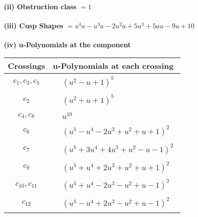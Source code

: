 \documentclass[1p]{elsarticle_modified}
\theoremstyle{definition}
\begin{document}
\flushleft \textbf{(ii) Obstruction class $= 1$}\\~\\
\flushleft \textbf{(iii) Cusp Shapes $= u^4 a- u^3 a-2 u^2 a+5 u^3+5 a u-9 u+10$}\\~\\
\newpage\renewcommand{\arraystretch}{1}
\flushleft \textbf{(iv) u-Polynomials at the component}\newline \\
\begin{tabular}{m{50pt}|m{274pt}}
Crossings & \hspace{64pt}u-Polynomials at each crossing \\
\hline $$\begin{aligned}c_{1},c_{3},c_{5}\end{aligned}$$&$\begin{aligned}
&(u^2- u+1)^5
\end{aligned}$\\
\hline $$\begin{aligned}c_{2}\end{aligned}$$&$\begin{aligned}
&(u^2+u+1)^5
\end{aligned}$\\
\hline $$\begin{aligned}c_{4},c_{8}\end{aligned}$$&$\begin{aligned}
&u^{10}
\end{aligned}$\\
\hline $$\begin{aligned}c_{6}\end{aligned}$$&$\begin{aligned}
&(u^5- u^4-2 u^3+u^2+u+1)^2
\end{aligned}$\\
\hline $$\begin{aligned}c_{7}\end{aligned}$$&$\begin{aligned}
&(u^5+3 u^4+4 u^3+u^2- u-1)^2
\end{aligned}$\\
\hline $$\begin{aligned}c_{9}\end{aligned}$$&$\begin{aligned}
&(u^5+u^4+2 u^3+u^2+u+1)^2
\end{aligned}$\\
\hline $$\begin{aligned}c_{10},c_{11}\end{aligned}$$&$\begin{aligned}
&(u^5+u^4-2 u^3- u^2+u-1)^2
\end{aligned}$\\
\hline $$\begin{aligned}c_{12}\end{aligned}$$&$\begin{aligned}
&(u^5- u^4+2 u^3- u^2+u-1)^2
\end{aligned}$\\
\hline
\end{tabular}\\~\\
\end{document}
